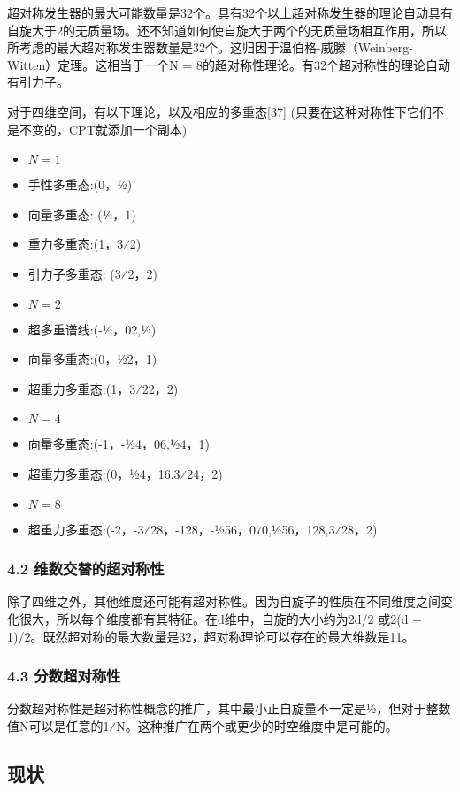 超对称发生器的最大可能数量是32个。具有32个以上超对称发生器的理论自动具有自旋大于2的无质量场。还不知道如何使自旋大于两个的无质量场相互作用，所以所考虑的最大超对称发生器数量是32个。这归因于温伯格-威滕（Weinberg-Witten）定理。这相当于一个N = 8的超对称性理论。有32个超对称性的理论自动有引力子。

对于四维空间，有以下理论，以及相应的多重态[37] (只要在这种对称性下它们不是不变的，CPT就添加一个副本)
\begin{itemize}
\item $N = 1$
\item 手性多重态:(0，1⁄2)
\item 向量多重态: (1⁄2，1)
\item 重力多重态:(1，3⁄2)
\item 引力子多重态: (3⁄2，2)
\end{itemize}
\begin{itemize}
\item $N = 2$
\item 超多重谱线:(-1⁄2，02,1⁄2)
\item 向量多重态:(0，1⁄22，1)
\item 超重力多重态:(1，3⁄22，2)
\end{itemize}
\begin{itemize}
\item $N = 4$
\item 向量多重态:(-1，-1⁄24，06,1⁄24，1)
\item 超重力多重态:(0，1⁄24，16,3⁄24，2)
\end{itemize}
\begin{itemize}
\item $N = 8$
\item 超重力多重态:(-2，-3⁄28，-128，-1⁄256，070,1⁄256，128,3⁄28，2)
\end{itemize}
\subsubsection{4.2 维数交替的超对称性}
除了四维之外，其他维度还可能有超对称性。因为自旋子的性质在不同维度之间变化很大，所以每个维度都有其特征。在d维中，自旋的大小约为2d/2 或2(d − 1)/2。既然超对称的最大数量是32，超对称理论可以存在的最大维数是11。
\subsubsection{4.3 分数超对称性}
分数超对称性是超对称性概念的推广，其中最小正自旋量不一定是1⁄2，但对于整数值N可以是任意的1⁄N。这种推广在两个或更少的时空维度中是可能的。

\subsection{现状}